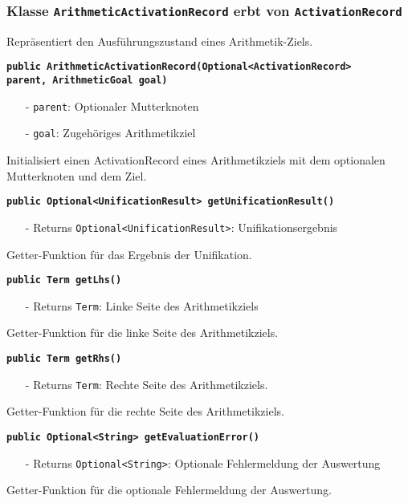 \documentclass[parskip=full,11pt,twoside]{scrartcl}
\begin{document}
\subsubsection{Klasse \texttt{ArithmeticActivationRecord} erbt von \texttt{ActivationRecord}}
Repräsentiert den Ausführungszustand eines Arithmetik-Ziels.

\textbf{\texttt{public ArithmeticActivationRecord(Optional<ActivationRecord>\\parent, ArithmeticGoal goal)}}
\begin{itemize}[noitemsep]
	\item[-] \texttt{parent}: Optionaler Mutterknoten
	\item[-] \texttt{goal}: Zugehöriges Arithmetikziel
\end{itemize}
Initialisiert einen ActivationRecord eines Arithmetikziels mit dem optionalen Mutterknoten und dem Ziel.

\textbf{\texttt{public Optional<UnificationResult> getUnificationResult()}}
\begin{itemize}[noitemsep]
	\item[-] Returns \texttt{Optional<UnificationResult>}: Unifikationsergebnis
\end{itemize}
Getter-Funktion für das Ergebnis der Unifikation.

\textbf{\texttt{public Term getLhs()}}
\begin{itemize}[noitemsep]
	\item[-] Returns \texttt{Term}: Linke Seite des Arithmetikziels
\end{itemize}
Getter-Funktion für die linke Seite des Arithmetikziels.

\textbf{\texttt{public Term getRhs()}}
\begin{itemize}[noitemsep]
	\item[-] Returns \texttt{Term}: Rechte Seite des Arithmetikziels.
\end{itemize}
Getter-Funktion für die rechte Seite des Arithmetikziels.

\textbf{\texttt{public Optional<String> getEvaluationError()}}
\begin{itemize}[noitemsep]
	\item[-] Returns \texttt{Optional<String>}: Optionale Fehlermeldung der Auswertung
\end{itemize}
Getter-Funktion für die optionale Fehlermeldung der Auswertung.
\end{document}
